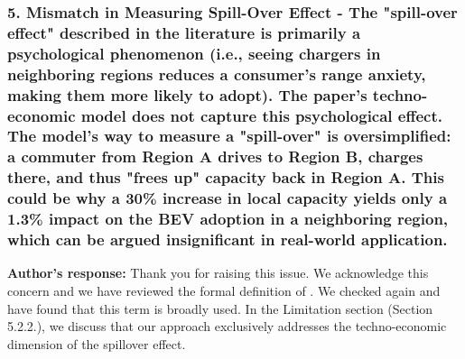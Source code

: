 \documentclass[11pt]{article}
\begin{document}
\subsubsection*{5. Mismatch in Measuring Spill-Over Effect - The "spill-over effect" described in the literature is primarily a psychological phenomenon (i.e., seeing chargers in neighboring regions reduces a consumer's range anxiety, making them more likely to adopt). The paper's techno-economic model does not capture this psychological effect. The model's way to measure a "spill-over" is oversimplified: a commuter from Region A drives to Region B, charges there, and thus "frees up" capacity back in Region A. This could be why a 30\% increase in local capacity yields only a 1.3\% impact on the BEV adoption in a neighboring region, which can be argued insignificant in real-world application.}
\color{authorblue}
\noindent \textcolor{authorblue}{\textbf{Author's response:}}
Thank you for raising this issue. We acknowledge this concern and  we have reviewed the formal definition of . We checked again and have found that this term is broadly used. In the Limitation section (Section 5.2.2.), we discuss that our approach exclusively addresses the techno-economic dimension of the spillover effect. 
\end{document}
